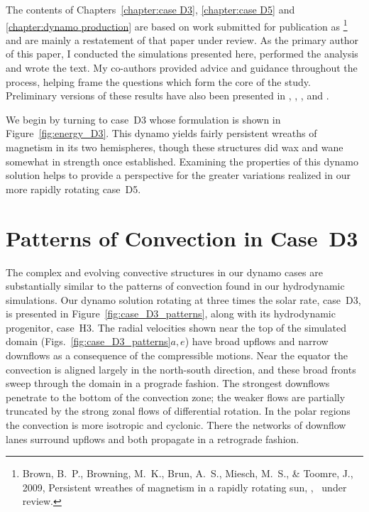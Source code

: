 The contents of Chapters~\ref{chapter:case D3}, \ref{chapter:case D5}
and \ref{chapter:dynamo production} are based on work submitted for
publication as
\cite{Brown_et_al_2009}\footnote{{Brown}, B.~P., {Browning}, M.~K., {Brun}, A.~S., {Miesch}, M.~S., \& {Toomre},
  J., 2009, {Persistent wreathes of magnetism in a rapidly rotating sun}, {\sl \apj},
  ~under review.}
and are mainly a restatement of that paper under review.  As the
primary author of this paper, I conducted the simulations presented
here, performed the analysis and wrote the text.  My co-authors
provided advice and guidance throughout the process, helping frame the
questions which form the core of the study.  Preliminary versions of
these results have also been presented in
\cite{Brown_AAS_2007a}, \cite{Brown_et_al_2007c},
\cite{Brown_AAS_2009}, and \cite{Brown_SPD_2009}.



We begin by turning to case~D3 whose formulation is shown in
Figure~\ref{fig:energy_D3}.  This dynamo yields fairly persistent
wreaths of magnetism in its two hemispheres, though these structures 
did wax and wane somewhat in strength once established.  Examining the
properties of this dynamo solution helps to provide a perspective for
the greater variations realized in our more rapidly rotating case~D5.

\section{Patterns of Convection in Case~D3}

The complex and evolving convective structures in our dynamo cases are
substantially similar to the patterns of convection found in our
hydrodynamic simulations.  Our dynamo solution rotating at three times
the solar rate, case~D3, is presented in
Figure~\ref{fig:case_D3_patterns}, along with its hydrodynamic
progenitor, case~H3.  The radial velocities shown near the
top of the simulated domain (Figs.~\ref{fig:case_D3_patterns}$a,e$)
have broad upflows and narrow downflows as a
consequence of the compressible motions.  Near the equator the
convection is aligned largely in the north-south direction, and
these broad fronts sweep through the domain in a prograde fashion.
The strongest downflows penetrate to the bottom of the convection zone;
the weaker flows are partially truncated by the strong zonal flows
of differential rotation.  In the polar regions the convection is more
isotropic and cyclonic.  There the networks of downflow lanes surround upflows
and both propagate in a retrograde fashion.


